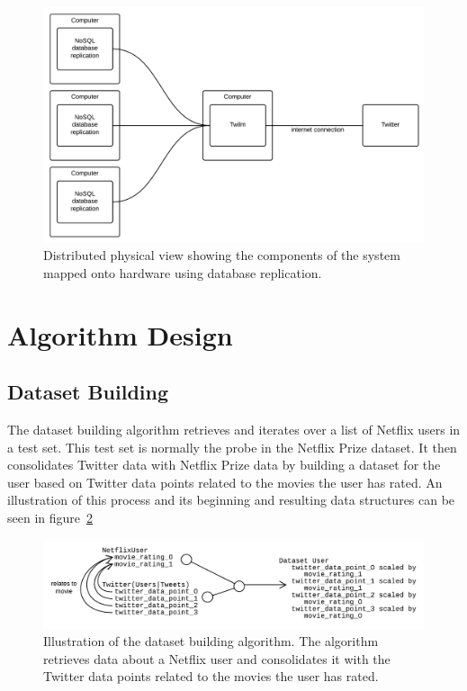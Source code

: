 \begin{figure}[H]
\centerline{\includegraphics[width=4.5in]{image/architecture-physical-view-distributed.png}}
\caption[Distributed physical view]{Distributed physical view showing the components of the system mapped onto hardware using database replication.}
\label{figure:distr-phys-view}
\end{figure}

\section{Algorithm Design}
\subsection{Dataset Building}\label{algorithm-design:dataset-building}
The dataset building algorithm retrieves and iterates over a list of Netflix users in a test set. This test set is normally the probe in the Netflix Prize dataset. It then consolidates Twitter data with Netflix Prize data by building a dataset for the user based on Twitter data points related to the movies the user has rated. An illustration of this process and its beginning and resulting data structures can be seen in figure~\ref{figure:dataset-building-algorithm}

\begin{figure}[H]
    \centerline{\includegraphics[width=6in]{image/design-algorithm-dataset-building.png}}
    \caption[Database building algorithm]{Illustration of the dataset building algorithm. The algorithm retrieves data about a Netflix user and consolidates it with the Twitter data points related to the movies the user has rated.}
    \label{figure:dataset-building-algorithm}
\end{figure}


